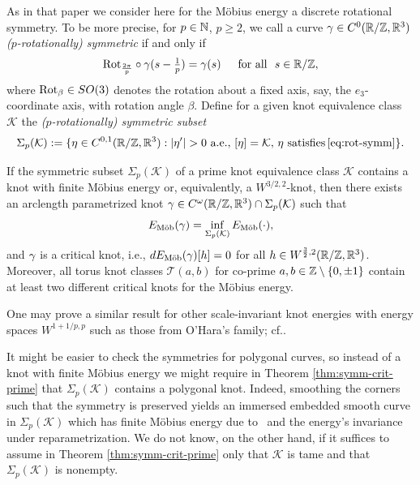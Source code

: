 As in that 
paper we consider here for the M\"obius energy a discrete rotational symmetry. To be
more precise, for $p\in\mathbb{N}$, $p\ge 2$, we call a 
curve $\gamma\in C^0(\mathbb{R}/\mathbb{Z},\mathbb{R}^3)$
\emph{($p$-rotationally) symmetric} if and only if
\begin{equation}
\label{eq:rot-symm}
\textstyle
{\textnormal{Rot}}_{\frac{2\pi}p}\circ\gamma(s -\frac1{p})=\gamma(s)\quad\,\,\,\text{for all }\,\, s\in\mathbb{R}/\mathbb{Z}, 
\end{equation}
where ${\textnormal{Rot}}_{\beta}\in SO(3)$ denotes the rotation about a fixed axis, say,
the $e_3$-coordinate axis, with rotation angle $\beta$.
Define for a given knot equivalence class $\mathcal{K}$ the 
\emph{($p$-rotationally) symmetric
subset}
\begin{equation}\label{eq:symmetric-subset}
\Sigma_p(\mathcal{K}):=\{\eta\in C^{0,1}(\R/\Z,\R^3):|\eta'|>0
\,\,\textnormal{a.e.},\, [\eta]=\mathcal{K},\,
\eta\,\,\textnormal{satisfies}\,\eqref{eq:rot-symm}\}.
\end{equation}
\begin{theorem}
\label{thm:symm-crit-prime}
If the symmetric subset $\Sigma_p(\mathcal{K})$
of a prime knot equivalence class $\mathcal{K}$ contains a knot with
finite M\"obius energy or, equivalently, a 
$W^{3/2,2}$-knot,
then
there exists an arclength parametrized knot $\gamma\in C^\omega(\mathbb{R}/\mathbb{Z},\mathbb{R}^3)
\cap\Sigma_p(\mathcal{K})$
such that
\begin{equation}\label{eq:minimizing}
{E_\textnormal{M\"ob}}(\gamma)=\inf_{\Sigma_p(\mathcal{K})}{E_\textnormal{M\"ob}}(\cdot),
\end{equation}
and  $\gamma$ is a critical knot, i.e., $d{E_\textnormal{M\"ob}} (\gamma)[h]=0$ for all
$h\in W^{\frac32,2}(\mathbb{R}/\mathbb{Z},\mathbb{R}^3)$. Moreover,
all torus knot classes $\mathcal{T}(a,b)$ for co-prime $a,b\in\mathbb{Z}\setminus\{0,\pm 1\}$
contain at least two different critical knots for the M\"obius energy.
\end{theorem}

One may prove a similar result for other scale-invariant knot energies
with energy spaces $W^{1+1/p,p}$
such as those from O'Hara's family; cf.\@ \cite{ohara_1992a,
blatt-etal_2022b}.

It might be easier to check the symmetries for polygonal
curves, so instead of a knot with finite M\"obius energy
we might require in Theorem \ref{thm:symm-crit-prime} that
$\Sigma_p(\mathcal{K})$ contains a polygonal knot.
Indeed, 
smoothing the corners such that the symmetry is preserved 
yields an immersed embedded smooth
curve in $\Sigma_p(\mathcal{K})$
which has finite Möbius energy due 
to~\cite{blatt_2012a} and the energy's invariance under reparametrization. We do not know, on the other hand, if it suffices
to assume in Theorem \ref{thm:symm-crit-prime} only
that $\mathcal{K}$ is tame and that
$\Sigma_p(\mathcal{K})$ is nonempty.



